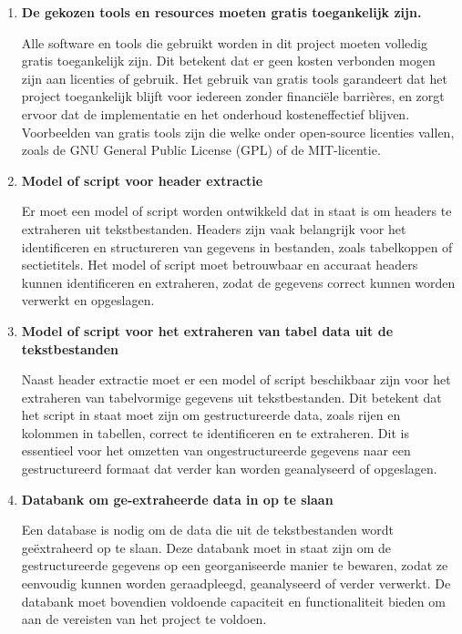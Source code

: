 \begin{enumerate}
    \item \textbf{De gekozen tools en resources moeten gratis toegankelijk zijn.}

        Alle software en tools die gebruikt worden in dit project moeten volledig gratis toegankelijk zijn. Dit betekent dat er geen kosten verbonden mogen zijn aan licenties of gebruik. Het gebruik van gratis tools garandeert dat het project toegankelijk blijft voor iedereen zonder financiële barrières, en zorgt ervoor dat de implementatie en het onderhoud kosteneffectief blijven. Voorbeelden van gratis tools zijn die welke onder open-source licenties vallen, zoals de GNU General Public License (GPL) of de MIT-licentie.

    
    \item \textbf{Model of script voor header extractie}

       Er moet een model of script worden ontwikkeld dat in staat is om headers te extraheren uit tekstbestanden. Headers zijn vaak belangrijk voor het identificeren en structureren van gegevens in bestanden, zoals tabelkoppen of sectietitels. Het model of script moet betrouwbaar en accuraat headers kunnen identificeren en extraheren, zodat de gegevens correct kunnen worden verwerkt en opgeslagen.

    
    \item \textbf{Model of script voor het extraheren van tabel data uit de tekstbestanden}

         Naast header extractie moet er een model of script beschikbaar zijn voor het extraheren van tabelvormige gegevens uit tekstbestanden. Dit betekent dat het script in staat moet zijn om gestructureerde data, zoals rijen en kolommen in tabellen, correct te identificeren en te extraheren. Dit is essentieel voor het omzetten van ongestructureerde gegevens naar een gestructureerd formaat dat verder kan worden geanalyseerd of opgeslagen.

    
    \item \textbf{Databank om ge-extraheerde data in op te slaan}

         Een database is nodig om de data die uit de tekstbestanden wordt geëxtraheerd op te slaan. Deze databank moet in staat zijn om de gestructureerde gegevens op een georganiseerde manier te bewaren, zodat ze eenvoudig kunnen worden geraadpleegd, geanalyseerd of verder verwerkt. De databank moet bovendien voldoende capaciteit en functionaliteit bieden om aan de vereisten van het project te voldoen.

\end{enumerate}

